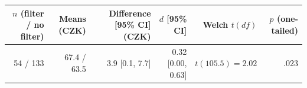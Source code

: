 \begin{tabular}{rrrrrr}
\toprule
$n$ (filter / no filter) & Means (CZK) & Difference [95\% CI] (CZK) & $d$ [95\% CI] & Welch $t(df)$ & $p$ (one-tailed) \\
\midrule
54 / 133 & 67.4 / 63.5 & 3.9 [0.1, 7.7] & 0.32 [0.00, 0.63] & $t(105.5) = 2.02$ & .023 \\
\bottomrule
\end{tabular}
